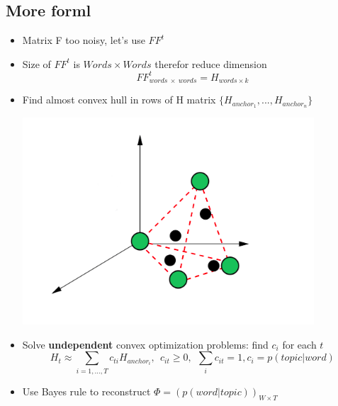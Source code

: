 \documentclass{beamer}
\begin{document}
\subsection*{More forml}
\begin{frame}
	\begin{itemize}
		\item Matrix F too noisy, let's use $FF^t$
		\item Size of $FF^t$ is $Words \times Words$ therefor reduce dimension
				$$FF^t_{words~\times~words} = H_{words \times k}$$ 
		\item Find almost convex hull in rows of H matrix $\{H_{anchor_1}, ..., H_{anchor_n}\}$
			\begin{center}
				\includegraphics[scale=0.3]{img/hull}
			\end{center}
			
		\item Solve \textbf{undependent} convex optimization problems: find $c_i$ for each $t$
		$$ H_t \approx \sum_{i = 1, \dots, T} c_{ti} H_{anchor_i},~~c_{it} \geq 0,~~\sum_i c_{it} = 1, c_i = p(topic|word)$$
		\item Use Bayes rule to reconstruct $\Phi = (p(word|topic))_{W \times T}$
	\end{itemize}
\end{frame}
\end{document}

